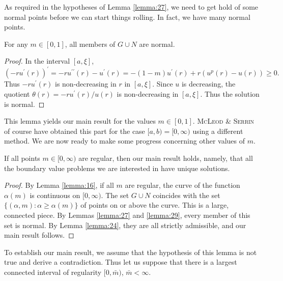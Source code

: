 As required in the hypotheses of Lemma \ref{lemma:27}, we need to get hold of some normal points
before we can start things rolling. In fact, we have many normal points.

\begin{lemma}\label{lemma:29}
  For any $m \in[0,1]$, all members of $G \cup N$ are normal.
\end{lemma}

\begin{proof}
  In the interval $[a, \xi]$,
  \begin{equation}\label{eq:4.16}
    \left(-r u^{\prime}(r)\right)^{\prime} = -r u^{\prime \prime}(r)-u^{\prime}(r)
      = -(1-m) u^{\prime}(r)+r\left(u^p(r)-u(r)\right) \geq 0 .
  \end{equation}
  Thus $-r u^{\prime}(r)$ is non-decreasing in $r$ in $[a, \xi]$.
  Since $u$ is decreasing, the quotient $\theta(r)=-r u^{\prime}(r) / u(r)$ is
  non-decreasing in $[a,\xi]$. Thus the solution is normal.
\end{proof}

This lemma yields our main result for the values $m \in[0,1]$.
\textsc{McLeod} \& \textsc{Serrin} of course have obtained this part for the case 
$[a, b)=[0, \infty)$ using a different method. We are now ready to make some progress 
concerning other values of $m$.

\begin{lemma}\label{lemma:30}
  If all points $m \in[0, \infty)$ are regular, then our main result holds, namely,
  that all the boundary value problems we are interested in have unique solutions.
\end{lemma}

\begin{proof}
  By Lemma \ref{lemma:16}, if all $m$ are regular, the curve of the function $\alpha(m)$
  is continuous on $[0, \infty)$.
  The set $G \cup N$ coincides with the set $\{(\alpha, m): \alpha \geq \alpha(m)\}$
  of points on or above the curve. This is a large, connected piece.
  By Lemmas \ref{lemma:27} and \ref{lemma:29}, every member of this set is normal.
  By Lemma \ref{lemma:24}, they are all strictly admissible, and our main result follows.
\end{proof}

To establish our main result, we assume that the hypothesis of this lemma is not true and derive a contradiction. Thus let us suppose that there is a largest connected interval of regularity $[0, \bar{m})$, $\bar{m}<\infty$.

